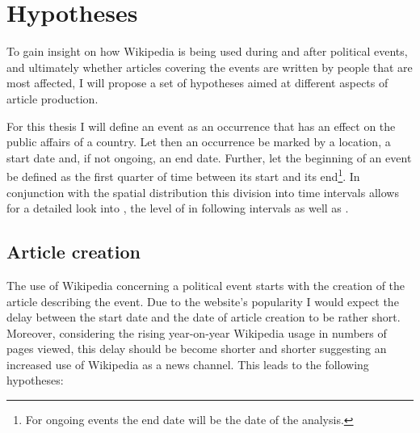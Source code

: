\chapter{Hypotheses}\label{ch:hypotheses}

To gain insight on how Wikipedia is being used during and after political events, and ultimately whether articles covering the events are written by people that are most affected, I will propose a set of hypotheses aimed at different aspects of article production.

For this thesis I will define an event as an occurrence that has an effect on the public affairs of a country.
Let then an occurrence be marked by a location, a start date and, if not ongoing, an end date. 
Further, let the beginning of an event be defined as the first quarter of time between its start and its end\footnote{For ongoing events the end date will be the date of the analysis.}.
In conjunction with the spatial distribution this division into time intervals allows for a detailed look into , the level of  in following intervals as well as  .

\section{Article creation}\label{sec:articlecreation}

The use of Wikipedia concerning a political event starts with the creation of the article describing the event.
Due to the website's popularity I would expect the delay between the start date and the date of article creation to be rather short.
Moreover, considering the rising year-on-year Wikipedia usage in numbers of pages viewed\cite{wikipv}, this delay should be become shorter and shorter suggesting an increased use of Wikipedia as a news channel.
This leads to the following hypotheses:



